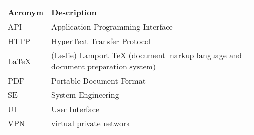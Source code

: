 \addtocounter{table}{-1}
\begin{longtable}{p{}p{}}\hline
\textbf{Acronym} & \textbf{Description}  \\\hline

API & Application Programming Interface \\\hline
HTTP & HyperText Transfer Protocol \\\hline
LaTeX & (Leslie) Lamport TeX (document markup language and document preparation system) \\\hline
PDF & Portable Document Format \\\hline
SE & System Engineering \\\hline
UI & User Interface \\\hline
VPN & virtual private network \\\hline
\end{longtable}
